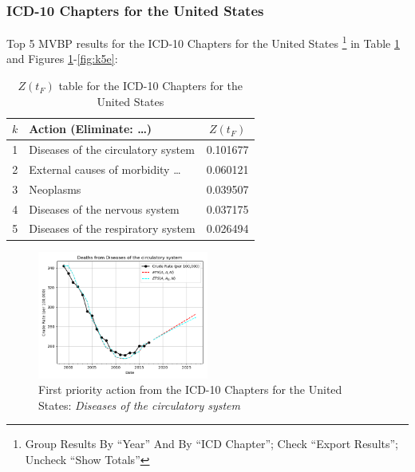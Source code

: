 \documentclass[10pt, a4paper, twocolumn]{IEEEconf}
\newcommand\footnotesstartsep{}
\begin{document}
\clearpage

\subsubsection{ICD-10 Chapters for the United States}

Top 5 MVBP results for the ICD-10 Chapters for the United States \citep{centers2017underlying}\footnotesstartsep\footnote{Group Results By \enquote{Year} And By \enquote{ICD Chapter}; Check \enquote{Export Results}; Uncheck \enquote{Show Totals}} in Table \ref{table:ztable5} and Figures \ref{fig:k5a}-\ref{fig:k5e}:

\begin{table}[H]
  \centering
  \begin{tabular}{clc}
    \toprule
      $k$ & Action (Eliminate: \ldots) & $Z(t_F)$ \\
    \midrule
      1 &         Diseases of the circulatory system & 0.101677 \\
      2 &        External causes of morbidity \ldots & 0.060121 \\
      3 &                                  Neoplasms & 0.039507 \\
      4 &             Diseases of the nervous system & 0.037175 \\
      5 &         Diseases of the respiratory system & 0.026494 \\
  \end{tabular}
  \caption{$Z(t_F)$ table for the ICD-10 Chapters for the United States}
  \label{table:ztable5}
\end{table}

\begin{figure}[H]
  \centering
  \includegraphics[width=0.5\textwidth]{results/US_ICD10_CHAPTERS/Diseases_of_the_circulatory_system_ets.png}
  \caption{First priority action from the ICD-10 Chapters for the United States: \textit{Diseases of the circulatory system}}\label{fig:k5a}
\end{figure}
\end{document}
